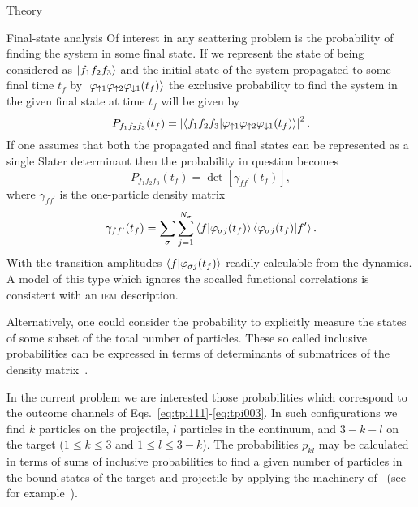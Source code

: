 \documentclass[aps, pra, reprint, groupedaddress, amsfonts,
               amsmath, amssymb, showpacs, nofootinbib]{revtex4-1}
\begin{document}
\begin{section}{Theory \label{sec:theory}}
\begin{subsection}{Final-state analysis \label{sec:probs}}
      Of interest in any scattering problem is the probability of finding the system in some final state.
      If we represent the state of being considered as $\ket{f_1 f_2 f_3}$ and the initial state of the
      system propagated to some final time $t_f$ by $\ket{\varphi_{ \uparrow 1} \varphi_{\uparrow 2}
      \varphi_{\downarrow 1} (t_f)}$ the exclusive probability to find the system in the given final
      state at time $t_f$ will be given by
      \begin{equation} \label{eq:finalProb}
         P_{f_1 f_2 f_3}(t_f) = \left| \braket{ f_1 f_2 f_3 | \varphi_{ \uparrow 1} \varphi_{\uparrow 2}
                                                \varphi_{\downarrow 1} (t_f) } \right|^2.
      \end{equation}
      If one assumes that both the propagated and final states can be represented as a single Slater
      determinant then the probability in question becomes
      \begin{equation} \label{eq:detProb}
         P_{f_1 f_2 f_3}(t_f) = \det \left[ \gamma_{f f^\prime}(t_f) \right],
      \end{equation}
      where $\gamma_{f f^\prime}$ is the one-particle density matrix
      \begin{equation} \label{eq:denmat}
         \gamma_{f f^\prime}(t_f) = \sum\limits_{\sigma} \sum\limits_{j = 1}^{N_\sigma}
                               \braket{f | \varphi_{\sigma j}(t_f)}
                               \braket{\varphi_{\sigma j}(t_f) | f^\prime}.
      \end{equation}
      With the transition amplitudes $\braket{f | \varphi_{\sigma j}(t_f)}$ readily calculable from the
      dynamics. A model of this type which ignores the socalled functional correlations is consistent with
      an \textsc{iem} description.

      Alternatively, one could consider the probability to explicitly measure the states of some subset
      of the total number of particles. These so called inclusive probabilities can be expressed in
      terms of determinants of submatrices of the density matrix~\cite{inc-prob}.
 
      In the current problem we are interested those probabilities which correspond to the outcome
      channels of Eqs.~\eqref{eq:tpi111}-\eqref{eq:tpi003}. In such configurations we find $k$ particles
      on the projectile, $l$ particles in the continuum, and $3 - k - l$ on the target ($1\leq k \leq 3$
      and $1 \leq l \leq 3 - k$). The probabilities $p_{kl}$ may be calculated in terms of sums of
      inclusive probabilities to find a given number of particles in the bound states of the target and
      projectile by applying the machinery of~\cite{inc-prob} (see for example~\cite{incEx, mitsuko12,
      gerald15}).

   \end{subsection}

\end{section}
\end{document}
